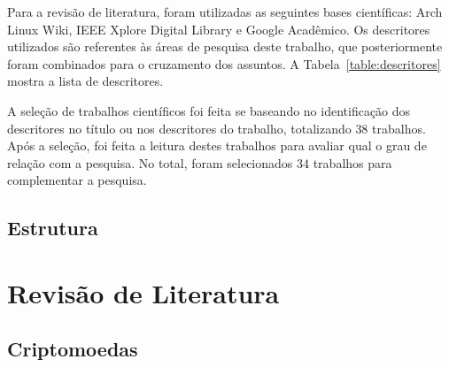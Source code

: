 \documentclass[
article,			%
12pt,				%
openright,			%
oneside,			%
a4paper,			%
chapter=TITLE,		%
section=TITLE,		%
subsection=TITLE,	%
subsubsection=TITLE,%
subsubsubsection=TITLE, %
english,			%
brazil,				%
]{abntex2}
\begin{document}
Para a revisão de literatura, foram utilizadas as seguintes bases
científicas: Arch Linux Wiki, IEEE Xplore Digital Library e Google
Acadêmico. Os descritores utilizados são referentes às áreas de
pesquisa deste trabalho, que posteriormente foram combinados para o
cruzamento dos assuntos. A Tabela~\ref{table:descritores} mostra a
lista de descritores.

\begin{table}[H]
    \centering
    \caption{\label{table:descritores}Descritores utilizados}
\end{table}

A seleção de trabalhos científicos foi feita se baseando no
identificação dos descritores no título ou nos descritores do
trabalho, totalizando $38$ trabalhos.  Após a seleção, foi feita a
leitura destes trabalhos para avaliar qual o grau de relação com a
pesquisa. No total, foram selecionados $34$ trabalhos para
complementar a pesquisa.

\subsection{Estrutura}

\section{Revisão de Literatura}

\subsection{Criptomoedas}
\end{document}

